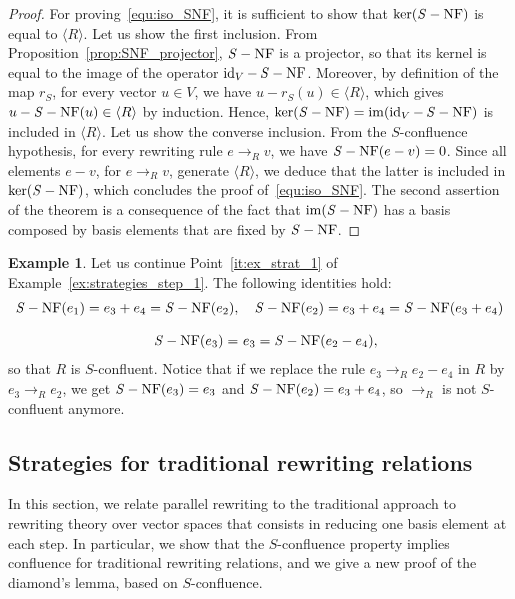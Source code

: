\documentclass[11pt]{article}
\theoremstyle{definition}
\newtheorem{example}[theorem]{Example}
\DeclareMathOperator{\id}{id}
\newcommand\Span[1]{\langle #1\rangle}
\DeclareMathOperator{\im}{im}
\newcommand\rewR{\to_R}
\DeclareMathOperator{\SNF}{{\it S}-NF}
\begin{document}
\begin{proof}
  For proving~\eqref{equ:iso_SNF}, it is sufficient to show that
  $\ker(\SNF)$ is equal to $\Span{R}$. Let us show the first inclusion.
  From Proposition~\ref{prop:SNF_projector}, $\SNF$ is a projector, so
  that its kernel is equal to the image of the operator $\id_V-\SNF$.
  Moreover, by definition of the map $r_S$, for every vector $u\in V$, we
  have $u-r_S(u)\in\Span{R}$, which gives $u-\SNF(u)\in\Span{R}$ by
  induction. Hence, $\ker(\SNF)=\im(\id_V-\SNF)$ is included in
  $\Span{R}$. Let us show the converse inclusion. From the $S$-confluence
  hypothesis, for every rewriting rule $e\rewR v$, we have $\SNF(e-v)=0$. 
  Since all elements $e-v$, for $e\rewR v$, generate $\Span{R}$, we 
  deduce that the latter is included in $\ker(\SNF)$, which concludes the
  proof of~\eqref{equ:iso_SNF}. The second assertion of the theorem is a
  consequence of the fact that $\im(\SNF)$ has a basis composed by basis
  elements that are fixed by $\SNF$.
\end{proof}
\smallskip

\begin{example}\label{ex:S-conf}
  Let us continue Point~\ref{it:ex_strat_1} of
  Example~\ref{ex:strategies_step_1}. The following identities hold:
  \[\begin{split}
  \SNF(e_1)=e_3+e_4=\SNF(e_2),&\quad\SNF(e_2)=e_3+e_4=\SNF(e_3+e_4)
  \\[0.3cm]
  \SNF(e_3)=& \ e_3=\SNF(e_2-e_4),
  \end{split}
  \smallskip\]
  so that $R$ is $S$-confluent. Notice that if we replace the rule
  $e_3\rewR e_2-e_4$ in $R$ by $e_3\rewR e_2$, we get $\SNF(e_3)=e_3$ and
  $\SNF(e_2)=e_3+e_4$, so $\rewR$ is not $S$-confluent anymore. 
\end{example}

\subsection{Strategies for traditional rewriting relations}
\label{sec:strategies_for_traditional_rewriting_relations}

In this section, we relate parallel rewriting to the traditional approach
to rewriting theory over vector spaces that consists in reducing one
basis element at each step. In particular, we show that the
$S$-confluence property implies confluence for traditional rewriting
relations, and we give a new proof of the diamond's lemma, based on
$S$-confluence.
\medskip
\end{document}
